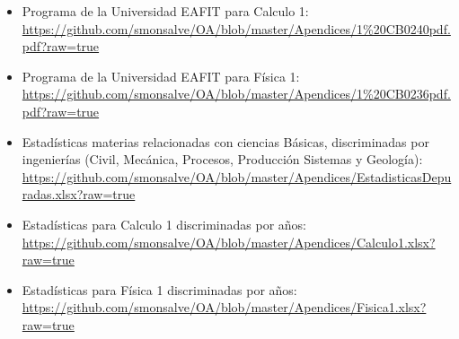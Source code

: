 \documentclass[twoside,letterpaper,12pt]{report}
\begin{document}
\begin{itemize}


	\item Programa de la Universidad EAFIT para Calculo 1:\\
	\url{https://github.com/smonsalve/OA/blob/master/Apendices/1%20CB0240pdf.pdf?raw=true}

	\item Programa de la Universidad EAFIT para Física 1:\\ 
	\url{https://github.com/smonsalve/OA/blob/master/Apendices/1%20CB0236pdf.pdf?raw=true}

	\item Estadísticas materias relacionadas con ciencias Básicas, discriminadas por ingenierías (Civil, Mecánica, Procesos, Producción Sistemas y Geología):\\
	\url{https://github.com/smonsalve/OA/blob/master/Apendices/EstadisticasDepuradas.xlsx?raw=true}

	\item Estadísticas para Calculo 1 discriminadas por años:\\
	\url{https://github.com/smonsalve/OA/blob/master/Apendices/Calculo1.xlsx?raw=true}

	\item Estadísticas para Física 1 discriminadas por años:\\
	\url{https://github.com/smonsalve/OA/blob/master/Apendices/Fisica1.xlsx?raw=true}


\end{itemize}
\end{document}
